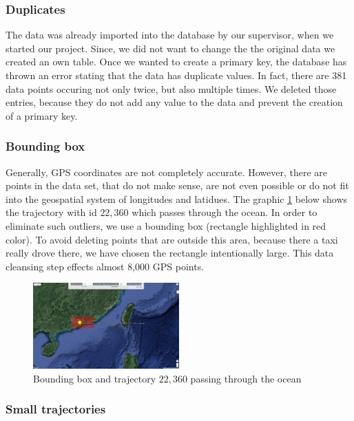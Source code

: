 \documentclass[10pt]{sig-alternate}
\begin{document}
\subsubsection{Duplicates}
The data was already imported into the database by our supervisor, when we started our project. Since, we did not want to change the the original data we created an own table. Once we wanted to create a primary key, the database has thrown an error stating that the data has duplicate values. In fact, there are 381 data points occuring not only twice, but also multiple times. We deleted those entries, because they do not add any value to the data and prevent the creation of a primary key.

\subsubsection{Bounding box}
Generally, GPS coordinates are not completely accurate. However, there are points in the data set, that do not make sense, are not even possible or do not fit into the geospatial system of longitudes and latidues. The graphic \ref{fig:bbox} below shows the trajectory with id $22,360$ which passes through the ocean. In order to eliminate such outliers, we use a bounding box (rectangle highlighted in red color). To avoid deleting points that are outside this area, because there a taxi really drove there, we have chosen the rectangle intentionally large. This data cleansing step effects almost 8,000 GPS points.

\begin{figure}[ht]
\centering
\includegraphics[width=0.5\textwidth]{img/bounding_box.png}
\caption{Bounding box and trajectory $22,360$ passing through the ocean}
\label{fig:bbox}
\end{figure}


\subsubsection{Small trajectories}
\end{document}
